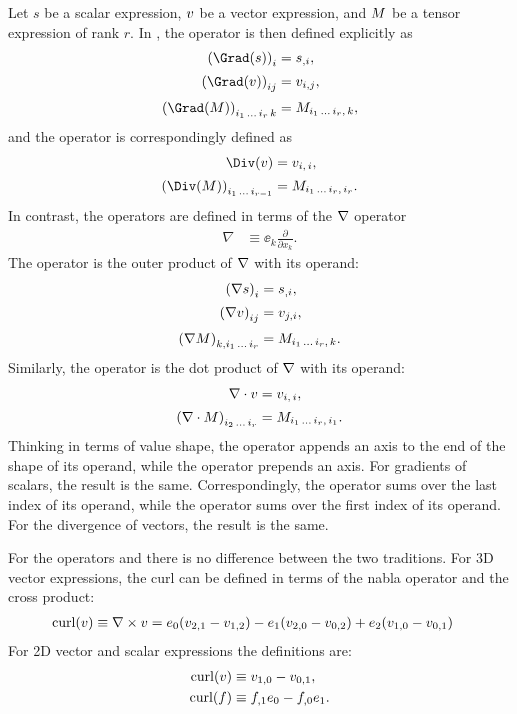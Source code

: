 Let $s$ be a scalar expression, ${v}$ be a vector expression,
and ${M}$ be a tensor expression of rank $r$.
In \ufl{}, the operator  is then defined explicitly as
\begin{align}
\left(\Grad (s) \right)_{i} &= s_{,i}, \\[2pt]
\left(\Grad (\vv) \right)_{ij} &= v_{i,j}, \\[2pt]
\left(\Grad (\MM) \right)_{i_1\,\ldots\,i_r\,k} &= M_{i_1\,\ldots\,i_r,\,k},
\end{align}
and the operator  is correspondingly defined as
\begin{align}
\Div (\vv) &= v_{i,\,i}, \\[2pt]
\left(\Div (\MM) \right)_{i_1\,\ldots\,i_{r-1}} &= M_{i_1\,\ldots\,i_r,\,i_r}.
\end{align}
In contrast, the  operators are defined
in terms of the $\operatorname{\nabla}$ operator
\begin{align}
  \nabla &\equiv \ee_k \frac{\partial}{\partial x_k}.
\end{align}
The operator  is the outer product of $\operatorname{\nabla}$ with its operand:
\begin{align}
\left(\nabla s\right)_i     &= s_{,i}, \\[2pt]
\left(\nabla {v}\right)_{ij} &= v_{j,i}, \\[2pt]
\left(\nabla {M} \right)_{k, i_1\,\ldots\,i_r} &= M_{i_1\,\ldots\,i_r,\,k}.
\end{align}
Similarly, the operator  is the dot product of $\operatorname{\nabla}$ with its operand:
\begin{align}
\nabla \cdot {v} &= v_{i,\,i}, \\[2pt]
\left(\nabla \cdot {M} \right)_{i_2\,\ldots\,i_r} &= M_{i_1\,\ldots\,i_r,\,i_1}.
\end{align}
Thinking in terms of value shape, the  operator appends
an axis to the end of the shape of its operand,
while the  operator prepends an axis.
For gradients of scalars, the result is the same.
Correspondingly, the  operator sums over the last index of its operand,
while the  operator sums over the first index of its operand.
For the divergence of vectors, the result is the same.

For the operators  and  there is no difference
between the two traditions. For 3D vector expressions, the curl can be
defined in terms of the nabla operator and the cross product:
\begin{align}
  \operatorname{curl}({v}) &\equiv \nabla \times {v} =
  {e}_0 (v_{2,1} - v_{1,2}) - {e}_1 (v_{2,0} - v_{0,2}) + {e}_2 (v_{1,0} - v_{0,1})
\end{align}
For 2D vector and scalar expressions the definitions are:
\begin{align}
  \operatorname{curl}({v}) &\equiv v_{1,0} - v_{0,1}, \\
  \operatorname{curl}(f)   &\equiv f_{,1}{e}_0 - f_{,0}{e}_1.
\end{align}

